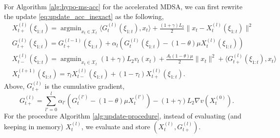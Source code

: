 \documentclass[11pt,fullpage,letterpaper]{article}
\newcommand{\mc}{\mathcal}
\DeclareMathOperator*{\argmin}{argmin}
\begin{document}
For Algorithm \ref{alg:hypo-ms-acc} for the accelerated MDSA, we can first rewrite the update \eqref{eq:update_acc_inexact} as the following,
\begin{align}\label{eq:tree_acc_inexact}
    & X_{t+}^{(l)}(\xi_{1:t}) = \argmin_{x_t\in \mc X_t}\langle G_{t}^{(l)}(\xi_{1:t}),x_t\rangle + \frac{(1+\gamma)L_2}{2}\|x_t-X_{t}^{(l)}(\xi_{1:t})\|^2\nonumber\\
    & G_{t+}^{(l)}(\xi_{1:t}) = G_{t+}^{(l-1)}(\xi_{1:t}) + \alpha_l (G_t^{(l)}(\xi_{1:t}) - (1-\theta)\mu X_t^{(l)}(\xi_{1:t}))\nonumber\\
    & X_{t-}^{(l)}(\xi_{1:t}) = \argmin_{x_t\in \mc X_t}  (1+\gamma)L_2v_t(x_t) + \frac{A_l(1-\theta)\mu}{2}\|x_t\|^2 + \langle G_{t+}^{(l)}(\xi_{1:t}),x_t\rangle\nonumber\\
    &X_{t}^{(l+1)}(\xi_{1:t}) = \tau_l X_{t-}^{(l)}(\xi_{1:t}) + (1-\tau_l)X_{t+}^{(l)}(\xi_{1:t}).
\end{align}
Above, $G_{t+}^{(l)} $ is the cumulative gradient, 
\begin{equation}\label{eq:cum_grad}
    G_{t+}^{(l)} = \sum_{l'=0}^{l} \alpha_{l'}( G_{t}^{(l')}-(1-\theta)\mu X_{t}^{(l')})- (1+\gamma)L_2 \nabla v(X^{(0)}_{t}).
\end{equation}
For the procedure Algorithm \ref{alg:update-procedure}, instead of evaluating (and keeping in memory) $X_t^{(l)}$, we evaluate and store $(X_{t}^{(l)}, G_{t+}^{(l)})$. 
\end{document}

